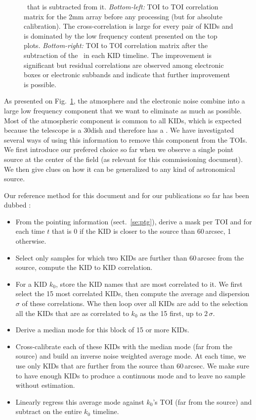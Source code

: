 \begin{figure}[hhh]
\begin{center}
{  \cm\ that is subtracted from it. \emph{Bottom-left:} TOI to TOI correlation
  matrix for the 2mm array before any processing (but for absolute
  calibration). The cross-correlation is large for every pair of KIDs and is
  dominated by the low frequency content presented on the top
  plots. \emph{Bottom-right:} TOI to TOI correlation matrix after the
  subtraction of the \cm\ in each KID timeline. The improvement is significant
  but residual correlations are observed among electronic boxes or electronic
  subbands and indicate that further improvement is possible.}
\label{fig:nika_toi}
\end{center}
\end{figure}

As presented on Fig.~\ref{fig:nika_toi}, the atmosphere and the electronic noise
combine into a large low frequency component that we want to eliminate as much
as possible. Most of the atmospheric component is common to all KIDs, which is
expected because the telescope is a 30\m dish and therefore has a . We have investigated several ways of using this
information to remove this component from the TOIs. We first introduce our
prefered choice so far when we observe a single point source at the center of
the field (as relevant for this commissioning document). We then give clues on
how it can be generalized to any kind of astronomical source.

Our reference method for this document and for our publications so far has been
dubbed \cmoneb:

\begin{itemize}
\item From the pointing information (sect.~\ref{se:ptg}), derive a mask per TOI
  and for each time $t$ that is 0 if the KID is closer to the source than 60\,arcsec, 1
  otherwise.
\item Select only samples for which two KIDs are further than 60\,arcsec from the source, compute
  the KID to KID correlation.
\item For a KID $k_0$, store the KID names that are most
  correlated to it. We first select the 15 most correlated KIDs, then compute
  the average and dispersion $\sigma$ of these correlations. Whe then loop over all KIDs
  are add to the selection all the KIDs that are as correlated to $k_0$ as the
  15 first, up to $2\,\sigma$.
\item Derive a median mode for this block of 15 or more KIDs.
\item Cross-calibrate each of these KIDs with the median mode (far from the
  source) and build an inverse noise weighted average mode. At each time, we use
  only KIDs that are further from the source than 60\,arcsec. We make sure to
  have enough KIDs to produce a continuous mode and to leave no sample without
  estimation.
\item Linearly regress this average mode against $k_0$'s TOI (far from the
  source) and subtract on the entire $k_0$ timeline.
\end{itemize}


